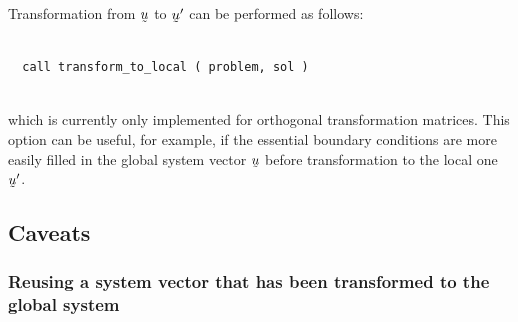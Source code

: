 Transformation from $\col u$ to $\col u'$ can be performed as follows:
\begin{verbatim}
   
  call transform_to_local ( problem, sol )
  
\end{verbatim}
which is currently only implemented for orthogonal transformation matrices.
This option can be useful, for example, if the essential boundary conditions
are more easily filled in the global system vector $\col u$ 
before transformation to the local one $\col u'$.

\subsection{Caveats}

\subsubsection{Reusing a system vector that has been transformed to the global system}

